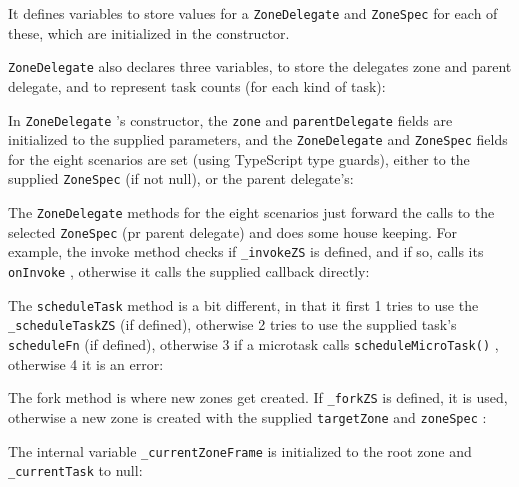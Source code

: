 It defines variables to store values for a
\texttt{ZoneDelegate}
and
\texttt{ZoneSpec}
for each of
these, which are initialized in the constructor.



\texttt{ZoneDelegate}
also declares three variables, to store the delegates zone and parent
delegate, and to represent task counts (for each kind of task):



In
\texttt{ZoneDelegate}
’s constructor, the
\texttt{zone}
and
\texttt{parentDelegate}
fields are initialized to
the supplied parameters, and the
\texttt{ZoneDelegate}
and
\texttt{ZoneSpec}
fields for the eight
scenarios are set (using TypeScript type guards), either to the supplied
\texttt{ZoneSpec}
(if
not null), or the parent delegate’s:



The
\texttt{ZoneDelegate}
methods for the eight scenarios just forward the calls to the
selected
\texttt{ZoneSpec}
(pr parent delegate) and does some house keeping. For example,
the invoke method checks if
\texttt{\_invokeZS}
is defined, and if so, calls its
\texttt{onInvoke}
,
otherwise it calls the supplied callback directly:



The
\texttt{scheduleTask}
method is a bit different, in that it first
1
tries to use the
\texttt{\_scheduleTaskZS}
(if defined), otherwise
2
tries to use the supplied task’s
\texttt{scheduleFn}
(if defined), otherwise
3
if a microtask calls
\texttt{scheduleMicroTask()}
, otherwise
4
it is
an error:



The fork method is where new zones get created. If
\texttt{\_forkZS}
is defined, it is used,
otherwise a new zone is created with the supplied
\texttt{targetZone}
and
\texttt{zoneSpec}
:



The internal variable
\texttt{\_currentZoneFrame}
is initialized to the root zone and
\texttt{\_currentTask}
to null:


